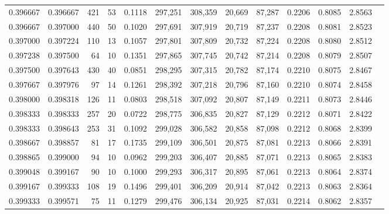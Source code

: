 \begin{tabular}{rrrrrrrrrrrrr}
0.396667 & 0.396667 &   421 &  53 &                                     0.1118 & 297,251 & 308,359 &  20,669 &  87,287 & 0.2206 & 0.8085 & 2.8563 \\
0.396667 & 0.397000 &   440 &  50 &                                     0.1020 & 297,691 & 307,919 &  20,719 &  87,237 & 0.2208 & 0.8081 & 2.8523 \\
0.397000 & 0.397224 &   110 &  13 &                                     0.1057 & 297,801 & 307,809 &  20,732 &  87,224 & 0.2208 & 0.8080 & 2.8512 \\
0.397238 & 0.397500 &    64 &  10 &                                     0.1351 & 297,865 & 307,745 &  20,742 &  87,214 & 0.2208 & 0.8079 & 2.8507 \\
0.397500 & 0.397643 &   430 &  40 &                                     0.0851 & 298,295 & 307,315 &  20,782 &  87,174 & 0.2210 & 0.8075 & 2.8467 \\
0.397667 & 0.397976 &    97 &  14 &                                     0.1261 & 298,392 & 307,218 &  20,796 &  87,160 & 0.2210 & 0.8074 & 2.8458 \\
0.398000 & 0.398318 &   126 &  11 &                                     0.0803 & 298,518 & 307,092 &  20,807 &  87,149 & 0.2211 & 0.8073 & 2.8446 \\
0.398333 & 0.398333 &   257 &  20 &                                     0.0722 & 298,775 & 306,835 &  20,827 &  87,129 & 0.2212 & 0.8071 & 2.8422 \\
0.398333 & 0.398643 &   253 &  31 &                                     0.1092 & 299,028 & 306,582 &  20,858 &  87,098 & 0.2212 & 0.8068 & 2.8399 \\
0.398667 & 0.398857 &    81 &  17 &                                     0.1735 & 299,109 & 306,501 &  20,875 &  87,081 & 0.2213 & 0.8066 & 2.8391 \\
0.398865 & 0.399000 &    94 &  10 &                                     0.0962 & 299,203 & 306,407 &  20,885 &  87,071 & 0.2213 & 0.8065 & 2.8383 \\
0.399048 & 0.399167 &    90 &  10 &                                     0.1000 & 299,293 & 306,317 &  20,895 &  87,061 & 0.2213 & 0.8064 & 2.8374 \\
0.399167 & 0.399333 &   108 &  19 &                                     0.1496 & 299,401 & 306,209 &  20,914 &  87,042 & 0.2213 & 0.8063 & 2.8364 \\
0.399333 & 0.399571 &    75 &  11 &                                     0.1279 & 299,476 & 306,134 &  20,925 &  87,031 & 0.2214 & 0.8062 & 2.8357 \\

\end{tabular}

